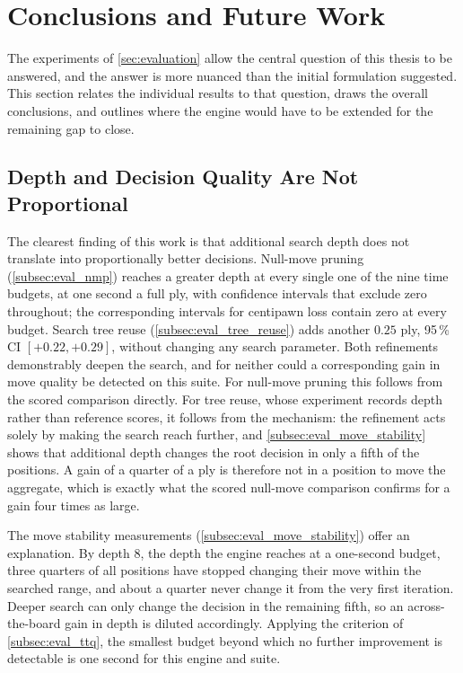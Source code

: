 \section{Conclusions and Future Work}
\label{sec:discussion}

The experiments of \cref{sec:evaluation} allow the central question of this
thesis to be answered, and the answer is more nuanced than the initial
formulation suggested. This section relates the individual results to that
question, draws the overall conclusions, and outlines where the engine would have
to be extended for the remaining gap to close.

\subsection{Depth and Decision Quality Are Not Proportional}
\label{subsec:discussion_depth_vs_quality}

The clearest finding of this work is that additional search depth does not
translate into proportionally better decisions. Null-move pruning
(\cref{subsec:eval_nmp}) reaches a greater depth at every single one of the nine
time budgets, at one second a full ply, with confidence intervals that exclude
zero throughout; the corresponding intervals for centipawn loss contain zero at
every budget. Search tree reuse (\cref{subsec:eval_tree_reuse}) adds another
$0.25$ ply, 95\,\% CI $[+0.22, +0.29]$, without changing any search parameter.
Both refinements demonstrably deepen the search, and for neither could a
corresponding gain in move quality be detected on this suite. For null-move
pruning this follows from the scored comparison directly. For tree reuse, whose
experiment records depth rather than reference scores, it follows from the
mechanism: the refinement acts solely by making the search reach further, and
\cref{subsec:eval_move_stability} shows that additional depth changes the root
decision in only a fifth of the positions. A gain of a quarter of a ply is
therefore not in a position to move the aggregate, which is exactly what the
scored null-move comparison confirms for a gain four times as large.

The move stability measurements (\cref{subsec:eval_move_stability}) offer an
explanation. By depth 8, the depth the engine reaches at a one-second budget,
three quarters of all positions have stopped changing their move within the
searched range, and about a quarter never change it from the very first
iteration. Deeper search can only change the decision in the remaining fifth, so
an across-the-board gain in depth is diluted accordingly. Applying the criterion
of \cref{subsec:eval_ttq}, the smallest budget beyond which no further
improvement is detectable is one second for this engine and suite.

